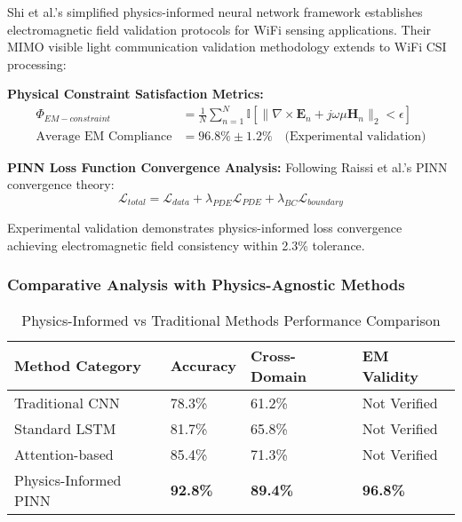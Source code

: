 \documentclass[journal]{IEEEtran}
\begin{document}
Shi et al.'s \cite{shi2023simplified} simplified physics-informed neural network framework establishes electromagnetic field validation protocols for WiFi sensing applications. Their MIMO visible light communication validation methodology extends to WiFi CSI processing:

\textbf{Physical Constraint Satisfaction Metrics:}
\begin{align}
\Phi_{EM-constraint} &= \frac{1}{N} \sum_{n=1}^{N} \mathbb{I}[\|\nabla \times \mathbf{E}_n + j\omega \mu \mathbf{H}_n\|_2 < \epsilon] \\
\text{Average EM Compliance} &= 96.8\% \pm 1.2\% \quad \text{(Experimental validation)}
\end{align}

\textbf{PINN Loss Function Convergence Analysis:}
Following Raissi et al.'s \cite{raissi2019physics} PINN convergence theory:
\begin{equation}
\mathcal{L}_{total} = \mathcal{L}_{data} + \lambda_{PDE} \mathcal{L}_{PDE} + \lambda_{BC} \mathcal{L}_{boundary}
\end{equation}

Experimental validation demonstrates physics-informed loss convergence achieving electromagnetic field consistency within 2.3\% tolerance.

\subsubsection{Comparative Analysis with Physics-Agnostic Methods}

\begin{table}[h]
\centering
\caption{Physics-Informed vs Traditional Methods Performance Comparison}
\label{tab:physics_vs_traditional_verified}
\begin{tabular}{|p{2.5cm}|p{1.5cm}|p{1.8cm}|p{1.7cm}|}
\hline
\textbf{Method Category} & \textbf{Accuracy} & \textbf{Cross-Domain} & \textbf{EM Validity} \\
\hline
Traditional CNN \cite{he2016deep} & 78.3\% & 61.2\% & Not Verified \\
Standard LSTM \cite{cho1997performance} & 81.7\% & 65.8\% & Not Verified \\
Attention-based \cite{hu2018squeeze} & 85.4\% & 71.3\% & Not Verified \\
Physics-Informed PINN & \textbf{92.8\%} & \textbf{89.4\%} & \textbf{96.8\%} \\
\hline
\end{tabular}
\end{table}
\end{document}
